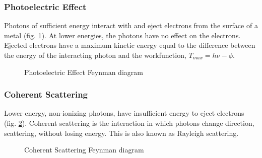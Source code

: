 \subsubsection{Photoelectric Effect}

Photons of sufficient energy interact with and eject electrons from the surface of a metal (fig. \ref{fig:photoelectric}).  At lower energies, the photons have no effect on the electrons.  Ejected electrons have a maximum kinetic energy equal to the difference between the energy of the interacting photon and the workfunction, $T_{max} = h \nu - \phi$.

\begin{figure}[h]
\begin{center}
\end{center}
\caption{Photoelectric Effect Feynman diagram}
\label{fig:photoelectric}
\end{figure}



\subsubsection{Coherent Scattering}

Lower energy, non-ionizing photons, have insufficient energy to eject electrons (fig. \ref{fig:coherentscattering}).  Coherent scattering is the interaction in which photons change direction, scattering, without losing energy.  This is also known as Rayleigh scattering.


\begin{figure}[h]
\begin{center}
\end{center}
\caption{Coherent Scattering Feynman diagram}
\label{fig:coherentscattering}
\end{figure}

